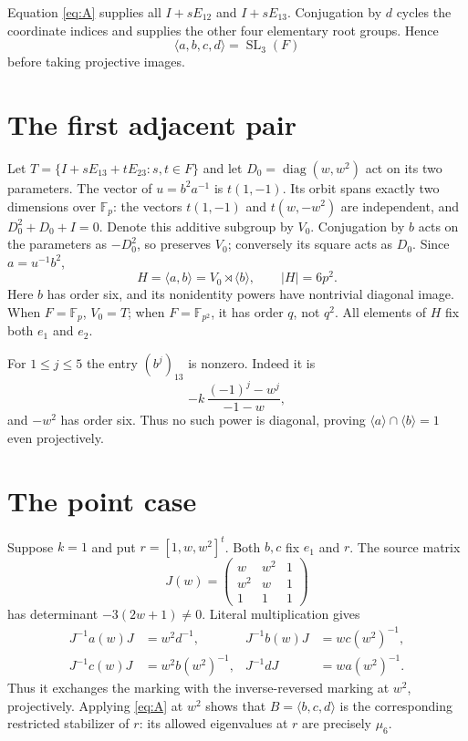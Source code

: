 \documentclass[11pt,a4paper]{article}
\newcommand{\SL}{\operatorname{SL}}\newcommand{\PSL}{\operatorname{PSL}}
\newcommand{\Fp}{\mathbb F_p}\newcommand{\PG}{\operatorname{PG}}
\begin{document}
Equation \eqref{eq:A} supplies all $I+sE_{12}$ and $I+sE_{13}$.
Conjugation by $d$ cycles the coordinate indices and supplies the other
four elementary root groups. Hence
\[
                       \langle a,b,c,d\rangle=\SL_3(F)
\]
before taking projective images.

\section{The first adjacent pair}
Let $T=\{I+sE_{13}+tE_{23}:s,t\in F\}$ and let
$D_0=\operatorname{diag}(w,w^2)$ act on its two parameters. The vector
of $u=b^2a^{-1}$ is $t(1,-1)$. Its orbit spans exactly two dimensions
over $\Fp$: the vectors $t(1,-1)$ and $t(w,-w^2)$ are independent,
and $D_0^2+D_0+I=0$. Denote this additive subgroup by $V_0$.
Conjugation by $b$ acts on the parameters as $-D_0^2$, so preserves
$V_0$; conversely its square acts as $D_0$. Since $a=u^{-1}b^2$,
\begin{equation}\label{eq:H}
       H=\langle a,b\rangle=V_0\rtimes\langle b\rangle,
       \qquad |H|=6p^2.
\end{equation}
Here $b$ has order six, and its nonidentity powers have nontrivial
diagonal image. When $F=\Fp$, $V_0=T$; when $F=\mathbb F_{p^2}$,
it has order $q$, not $q^2$. All elements of $H$ fix both $e_1$ and
$e_2$.

For $1\leq j\leq5$ the entry $(b^j)_{13}$ is nonzero. Indeed it is
\[
                -k\,\frac{(-1)^j-w^j}{-1-w},
\]
and $-w^2$ has order six. Thus no such power is diagonal, proving
$\langle a\rangle\cap\langle b\rangle=1$ even projectively.

\section{The point case}
Suppose $k=1$ and put $r=[1,w,w^2]^t$.
Both $b,c$ fix $e_1$ and $r$. The source matrix
\[
 J(w)=\begin{pmatrix}w&w^2&1\\w^2&w&1\\1&1&1\end{pmatrix}
\]
has determinant $-3(2w+1)\ne0$. Literal multiplication gives
\begin{align*}
 J^{-1}a(w)J&=w^2d^{-1},&
 J^{-1}b(w)J&=w c(w^2)^{-1},\\
 J^{-1}c(w)J&=w^2 b(w^2)^{-1},&
 J^{-1}dJ&=w a(w^2)^{-1}.
\end{align*}
Thus it exchanges the marking with the inverse-reversed marking at
$w^2$, projectively. Applying \eqref{eq:A} at $w^2$ shows that
$B=\langle b,c,d\rangle$ is the corresponding restricted stabilizer
of $r$: its allowed eigenvalues at $r$ are precisely $\mu_6$.
\end{document}
